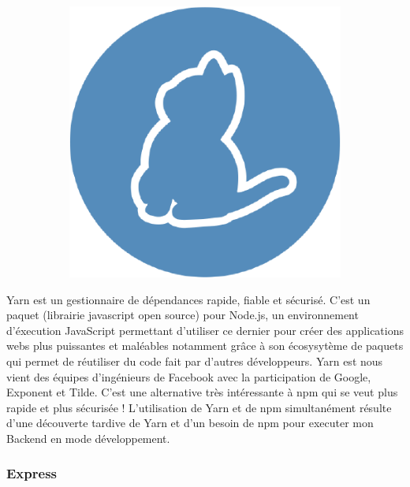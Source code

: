 \documentclass{article}
\begin{document}
\begin{figure}[h!]
	\centering
  	\begin{subfigure}[b]{0.2\linewidth}
    \includegraphics[width=\linewidth]{yarn.png}
  	\end{subfigure}
\end{figure}

Yarn est un gestionnaire de dépendances rapide, fiable et sécurisé. C'est un paquet (librairie javascript open source) pour Node.js, un environnement d'éxecution JavaScript permettant d'utiliser ce dernier pour créer des applications webs plus puissantes et maléables notamment grâce à son écosysytème de paquets qui permet de réutiliser du code fait par d'autres développeurs.
Yarn est nous vient des équipes d'ingénieurs de Facebook avec la participation de Google, Exponent et Tilde. C'est une alternative très intéressante à npm qui se veut plus rapide et plus sécurisée ! L'utilisation de Yarn et de npm simultanément résulte d'une découverte tardive de Yarn et d'un besoin de npm pour executer mon Backend en mode développement.

\subsubsection{Express}
\end{document}
